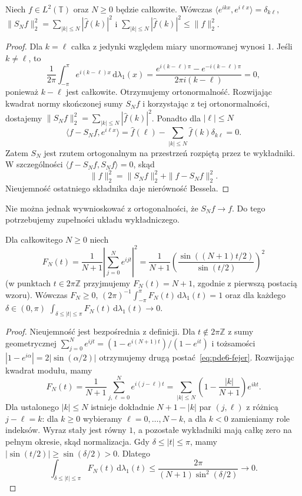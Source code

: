 \begin{lemat}
\label{lem:pde6-bessel}
Niech $f\in L^2(\mathbb T)$ oraz $N\geq0$ będzie całkowite. Wówczas
$\langle e^{ikx},e^{i\ell x}\rangle=\delta_{k\ell}$,
$\|S_Nf\|_2^2=\sum_{|k|\le N}|\widehat f(k)|^2$ i
$\sum_{|k|\le N}|\widehat f(k)|^2\le\|f\|_2^2$.
\end{lemat}
\begin{proof}
Dla $k=\ell$ całka z jedynki względem miary
unormowanej wynosi $1$. Jeśli $k\ne\ell$, to
\[
 \frac1{2\pi}\int_{-\pi}^{\pi}e^{i(k-\ell)x}\,
 \mathrm d\lambda_1(x)
 =\frac{e^{i(k-\ell)\pi}-e^{-i(k-\ell)\pi}}
 {2\pi i(k-\ell)}=0,
\]
ponieważ $k-\ell$ jest całkowite. Otrzymujemy
ortonormalność. Rozwijając kwadrat normy skończonej
sumy $S_Nf$ i korzystając z tej ortonormalności,
dostajemy $\|S_Nf\|_2^2=\sum_{|k|\le N}|\widehat f(k)|^2$.
Ponadto dla $|\ell|\leq N$
\[
 \langle f-S_Nf,e^{i\ell x}\rangle
 =\widehat f(\ell)-\sum_{|k|\leq N}
 \widehat f(k)\delta_{k\ell}=0.
\]
Zatem $S_N$ jest rzutem ortogonalnym na przestrzeń
rozpiętą przez te wykładniki. W szczególności
$\langle f-S_Nf,S_Nf\rangle=0$, skąd
\[
 \|f\|_2^2=\|S_Nf\|_2^2+\|f-S_Nf\|_2^2.
\]
Nieujemność ostatniego składnika daje nierówność Bessela.
\end{proof}

Nie można jednak wywnioskować z ortogonalności, że $S_Nf\to f$.
Do tego potrzebujemy zupełności układu wykładniczego.

\begin{lemat}
\label{lem:pde6-fejer}
Dla całkowitego $N\geq0$ niech
\begin{equation}\label{eq:pde6-fejer}
 F_N(t)=\frac1{N+1}\left|\sum_{j=0}^Ne^{ijt}\right|^2
 =\frac1{N+1}\left(\frac{\sin((N+1)t/2)}{\sin(t/2)}\right)^2
\end{equation}
(w punktach $t\in2\pi\mathbb Z$ przyjmujemy
$F_N(t)=N+1$, zgodnie z pierwszą postacią wzoru). Wówczas $F_N\ge0$,
$(2\pi)^{-1}\int_{-\pi}^{\pi}F_N(t)\,\mathrm d\lambda_1(t)=1$ oraz
dla każdego $\delta\in(0,\pi)$
$\int_{\delta\le|t|\le\pi}F_N(t)\,\mathrm d\lambda_1(t)\to0$.
\end{lemat}
\begin{proof}
Nieujemność jest bezpośrednia z definicji.
Dla $t\notin2\pi\mathbb Z$ z sumy geometrycznej
$\sum_{j=0}^N e^{ijt}=(1-e^{i(N+1)t})/(1-e^{it})$
i tożsamości $|1-e^{i\alpha}|=2|\sin(\alpha/2)|$
otrzymujemy drugą postać~\eqref{eq:pde6-fejer}.
Rozwijając kwadrat modułu, mamy
\[
 F_N(t)=\frac1{N+1}\sum_{j,\ell=0}^N e^{i(j-\ell)t}
 =\sum_{|k|\leq N}\left(1-\frac{|k|}{N+1}\right)e^{ikt}.
\]
Dla ustalonego $|k|\leq N$ istnieje dokładnie
$N+1-|k|$ par $(j,\ell)$ z różnicą $j-\ell=k$:
dla $k\geq0$ wybieramy $\ell=0,\ldots,N-k$,
a dla $k<0$ zamieniamy role indeksów.
Wyraz stały jest równy $1$, a pozostałe
wykładniki mają całkę zero na pełnym okresie,
skąd normalizacja. Gdy $\delta\leq|t|\leq\pi$,
mamy $|\sin(t/2)|\geq\sin(\delta/2)>0$.
Dlatego
\[
 \int_{\delta\leq|t|\leq\pi}F_N(t)\,\mathrm d\lambda_1(t)
 \leq\frac{2\pi}{(N+1)\sin^2(\delta/2)}
 \longrightarrow0.
\]
\end{proof}

